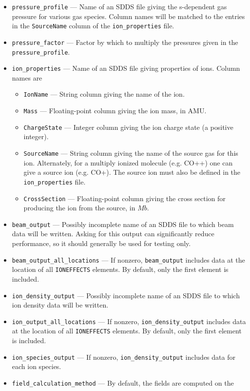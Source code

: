 \documentclass[11pt]{article}
\begin{document}
\begin{itemize}
\item \verb|pressure_profile| --- Name of an SDDS file giving the s-dependent gas pressure for
  various gas species. Column names will be matched to the entries in the \verb|SourceName| column of the
  \verb|ion_properties| file.
\item \verb|pressure_factor| --- Factor by which to multiply the pressures given in the \verb|pressure_profile|.
\item \verb|ion_properties| --- Name of an SDDS file giving properties of ions. Column names are
  \begin{itemize}
  \item \verb|IonName| --- String column giving the name of the ion.
  \item \verb|Mass| --- Floating-point column giving the ion mass, in AMU.
  \item \verb|ChargeState| --- Integer column giving the ion charge state (a positive integer).
  \item \verb|SourceName| --- String column giving the name of the source gas for this ion.
    Alternately, for a multiply ionized molecule (e.g. CO++) one can give a source ion (e.g. CO+).  The source ion must also be defined in the \verb|ion_properties| file.
  \item \verb|CrossSection| --- Floating-point column giving the cross section for producing the ion from the source, in $Mb$.
  \end{itemize}
\item \verb|beam_output| --- Possibly incomplete name of an SDDS file to which beam data will be written.
  Asking for this output can significantly reduce performance, so it should generally be used for testing only.
\item \verb|beam_output_all_locations| --- If nonzero, \verb|beam_output| includes data at the location of
  all \verb|IONEFFECTS| elements. By default, only the first element is included.
\item \verb|ion_density_output| --- Possibly incomplete name of an SDDS file to which ion density data will be written.
\item \verb|ion_output_all_locations| --- If nonzero, \verb|ion_density_output| includes data at the location of
  all \verb|IONEFFECTS| elements. By default, only the first element is included.
\item \verb|ion_species_output| --- If nonzero, \verb|ion_density_output| includes data for each ion species.
\item \verb|field_calculation_method| --- By default, the fields are computed on the

\end{itemize}
\end{document}
